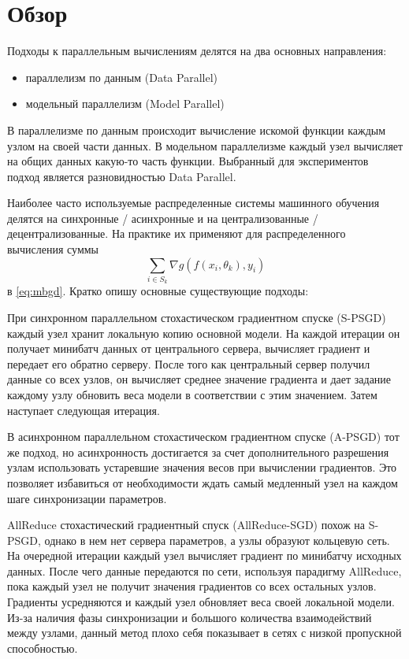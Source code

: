 \documentclass[a4paper,article,14pt]{extarticle}
\begin{document}
\section{Обзор}
Подходы к параллельным вычислениям делятся на два основных направления:
\begin{itemize}
\item параллелизм по данным (Data Parallel)
\item модельный параллелизм (Model Parallel)
\end{itemize}

В параллелизме по данным происходит вычисление искомой функции каждым узлом на своей части данных. В модельном параллелизме каждый узел вычисляет на общих данных какую-то часть функции. Выбранный для экспериментов подход является разновидностью Data Parallel.

Наиболее часто используемые распределенные системы машинного обучения делятся на синхронные / асинхронные и на централизованные / децентрализованные. На практике их применяют для распределенного вычисления суммы
\begin{equation}
\sum_{i\in S_k}\nabla g(f(x_i, \theta_k), y_i)
\end{equation}
в \ref{eq:mbgd}. Кратко опишу основные существующие подходы:

При синхронном параллельном стохастическом градиентном спуске (S-PSGD) \cite{o1} каждый узел хранит локальную копию основной модели. На каждой итерации он получает минибатч данных от центрального сервера, вычисляет градиент и передает его обратно серверу. После того как центральный сервер получил данные со всех узлов, он вычисляет среднее значение градиента и дает задание каждому узлу обновить веса модели в соответствии с этим значением. Затем наступает следующая итерация.

В асинхронном параллельном стохастическом градиентном спуске (A-PSGD) \cite{o2, o3, o4, o5} тот же подход, но асинхронность достигается за счет дополнительного разрешения узлам использовать устаревшие значения весов при вычислении градиентов. Это позволяет избавиться от необходимости ждать самый медленный узел на каждом шаге синхронизации параметров.

AllReduce стохастический градиентный спуск (AllReduce-SGD) \cite{o6, o7} похож на  S-PSGD,  однако в нем нет сервера параметров, а узлы образуют кольцевую сеть. На очередной итерации каждый узел вычисляет градиент по минибатчу исходных данных. После чего данные передаются по сети, используя парадигму AllReduce, пока каждый узел не получит значения градиентов со всех остальных узлов. Градиенты усредняются и каждый узел обновляет веса своей локальной модели. Из-за наличия фазы синхронизации и большого количества взаимодействий между узлами, данный метод плохо себя показывает в сетях с низкой пропускной способностью.
\end{document}
